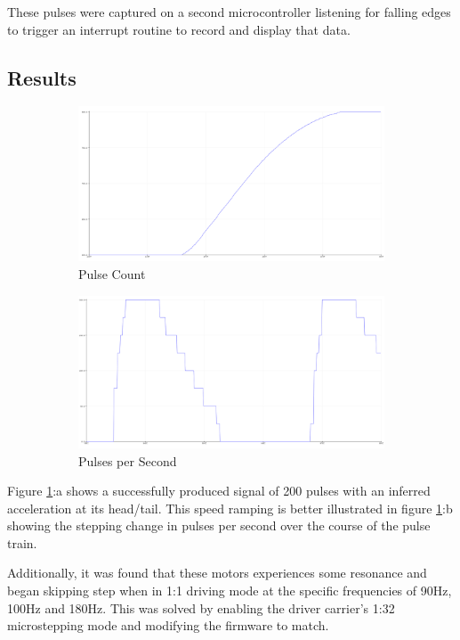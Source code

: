 These pulses were captured on a second microcontroller listening for falling edges to trigger an interrupt routine to record and display that data.

\subsection{Results}

\begin{figure}[h]
    \centering
    \begin{subfigure}{.45\textwidth}
        \centering
        \includegraphics[width=0.8\linewidth]{img/stepper_pulses.PNG}
        \caption{Pulse Count}
    \end{subfigure}%
    \begin{subfigure}{.45\textwidth}
        \centering
        \includegraphics[width=0.8\linewidth]{img/stepper_pulse_acc.PNG}
        \caption{Pulses per Second}
    \end{subfigure}
    \caption{}
    \label{fig:code}
\end{figure}

Figure \ref{fig:code}:a shows a successfully produced signal of 200 pulses with an inferred acceleration at its head/tail. This speed ramping is better illustrated in figure \ref{fig:code}:b showing the stepping change in pulses per second over the course of the pulse train.

Additionally, it was found that these motors experiences some resonance and began skipping step when in 1:1 driving mode at the specific frequencies of 90Hz, 100Hz and 180Hz. This was solved by enabling the driver carrier's 1:32 microstepping mode and modifying the firmware to match.

